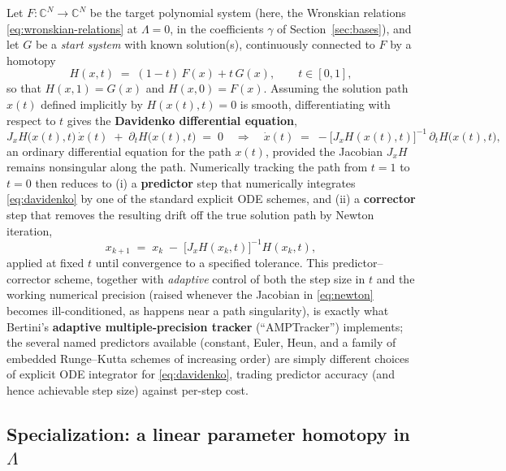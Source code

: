 \documentclass[11pt]{article}
\begin{document}
Let $F:\mathbb{C}^N\to\mathbb{C}^N$ be the target polynomial system (here,
the Wronskian relations \eqref{eq:wronskian-relations} at $\Lambda=0$,
in the coefficients $\gamma$ of Section~\ref{sec:bases}), and let $G$ be a
\emph{start system} with known solution(s), continuously connected to $F$
by a homotopy
\begin{equation}
  \label{eq:homotopy-general}
  H(x,t) \;=\; (1-t)\,F(x) + t\,G(x), \qquad t\in[0,1],
\end{equation}
so that $H(x,1)=G(x)$ and $H(x,0)=F(x)$. Assuming the solution path
$x(t)$ defined implicitly by $H(x(t),t)=0$ is smooth, differentiating with
respect to $t$ gives the \textbf{Davidenko differential equation},
\begin{equation}
  \label{eq:davidenko}
  J_x H\bigl(x(t),t\bigr)\, \dot x(t) \;+\; \partial_t H\bigl(x(t),t\bigr) \;=\; 0
  \quad\Longrightarrow\quad
  \dot x(t) \;=\; -\bigl[J_x H(x(t),t)\bigr]^{-1}\,\partial_t H\bigl(x(t),t\bigr),
\end{equation}
an ordinary differential equation for the path $x(t)$, provided the
Jacobian $J_x H$ remains nonsingular along the path. Numerically tracking
the path from $t=1$ to $t=0$ then reduces to (i) a \textbf{predictor} step
that numerically integrates \eqref{eq:davidenko} by one of the standard
explicit ODE schemes, and (ii) a \textbf{corrector} step that removes the
resulting drift off the true solution path by Newton iteration,
\begin{equation}
  \label{eq:newton}
  x_{k+1} \;=\; x_k \;-\; \bigl[J_x H(x_k,t)\bigr]^{-1} H(x_k,t),
\end{equation}
applied at fixed $t$ until convergence to a specified tolerance. This
predictor--corrector scheme, together with \emph{adaptive} control of both
the step size in $t$ and the working numerical precision (raised whenever
the Jacobian in \eqref{eq:newton} becomes ill-conditioned, as happens near
a path singularity), is exactly what Bertini's \textbf{adaptive
multiple-precision tracker} (``AMPTracker'') implements; the several
named predictors available (constant, Euler, Heun, and a family of
embedded Runge--Kutta schemes of increasing order) are simply different
choices of explicit ODE integrator for \eqref{eq:davidenko}, trading
predictor accuracy (and hence achievable step size) against per-step
cost.

\subsection{Specialization: a linear parameter homotopy in
\texorpdfstring{$\Lambda$}{Lambda}}
\label{sec:parameter-homotopy}
\end{document}

